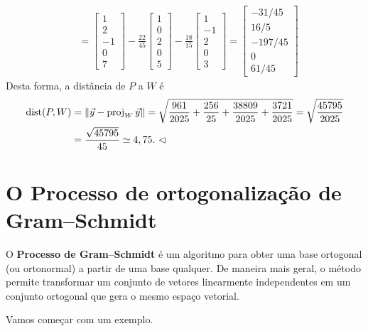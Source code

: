 \documentclass[../livro.tex]{subfiles}  %
\begin{document}
\begin{example}
\begin{align*}
   & = \begin{bmatrix}
1 \\ 2 \\ -1 \\ 0 \\ 7
\end{bmatrix} - \frac{22}{45}
\begin{bmatrix}
1 \\ 0 \\ 2 \\ 0 \\ 5
\end{bmatrix} - \frac{18}{15}
\begin{bmatrix}
1 \\ -1 \\ 2 \\ 0 \\ 3
\end{bmatrix} =
\begin{bmatrix}
-31/45 \\ 16/5 \\ -197/45 \\ 0 \\ 61/45
\end{bmatrix}
  \end{align*}
  Desta forma, a distância de $P$ a $W$ é
  \begin{align*}
\operatorname{dist} (P,W) & = \|\vec{y} - \operatorname{proj}_{W} \vec{y}\| = \sqrt{\frac{961}{2025} + \frac{256}{25} + \frac{38809}{2025} + \frac{3721}{2025}} = \sqrt{\frac{ 45795 }{2025}} \\
           & = \frac{ \sqrt{45795} }{45} \simeq 4,75. \ \lhd
  \end{align*}
\end{example}




\section{O Processo de ortogonalização de Gram--Schmidt}

O \textbf{Processo de Gram--Schmidt} é um algoritmo para obter uma base ortogonal (ou ortonormal) a partir de uma base qualquer. De maneira mais geral, o método permite transformar um conjunto de vetores linearmente independentes em um conjunto ortogonal que gera o mesmo espaço vetorial. 

Vamos começar com um exemplo.
\end{document}
